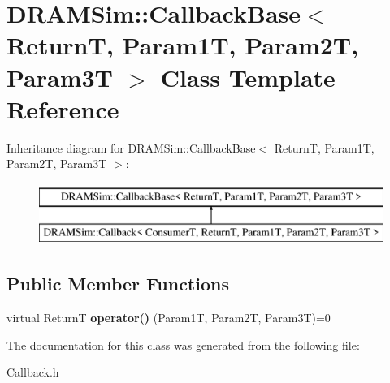 \hypertarget{classDRAMSim_1_1CallbackBase}{\section{D\-R\-A\-M\-Sim\-:\-:Callback\-Base$<$ Return\-T, Param1\-T, Param2\-T, Param3\-T $>$ Class Template Reference}
\label{classDRAMSim_1_1CallbackBase}
}
Inheritance diagram for D\-R\-A\-M\-Sim\-:\-:Callback\-Base$<$ Return\-T, Param1\-T, Param2\-T, Param3\-T $>$\-:\begin{figure}[H]
\begin{center}
\leavevmode
\includegraphics[height=2.000000cm]{classDRAMSim_1_1CallbackBase}
\end{center}
\end{figure}
\subsection*{Public Member Functions}
\begin{DoxyCompactItemize}
\item 
\hypertarget{classDRAMSim_1_1CallbackBase_abe02615a53f1dd67dfc26ca011c7e1a8}{virtual Return\-T {\bfseries operator()} (Param1\-T, Param2\-T, Param3\-T)=0}\label{classDRAMSim_1_1CallbackBase_abe02615a53f1dd67dfc26ca011c7e1a8}

\end{DoxyCompactItemize}


The documentation for this class was generated from the following file\-:\begin{DoxyCompactItemize}
\item 
Callback.\-h\end{DoxyCompactItemize}
